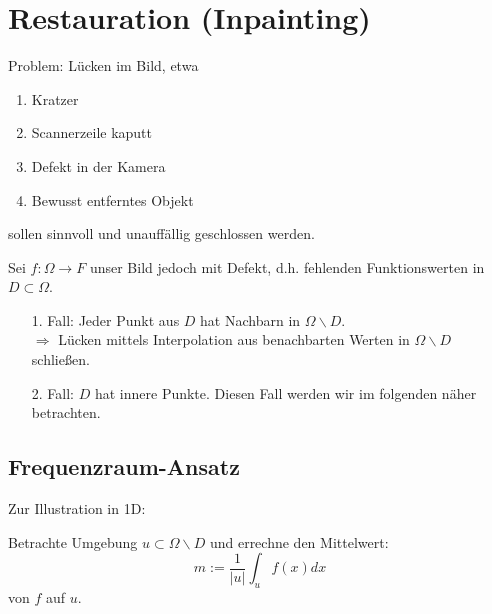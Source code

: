 \documentclass{article}
\theoremstyle{plain}
\theoremstyle{definition}
\numberwithin{equation}{section}
\newcommand{\abs}[1] {
\left| #1 \right|
}
\begin{document}
                \section{Restauration (Inpainting)}
  Problem: Lücken im Bild, etwa 

  \begin{enumerate}
    \item Kratzer
    \item Scannerzeile kaputt
    \item Defekt in der Kamera
    \item Bewusst entferntes Objekt
  \end{enumerate}
  sollen sinnvoll und unauffällig geschlossen werden.

  Sei $f: \Omega \to F$ unser Bild jedoch mit Defekt, d.h. fehlenden Funktionswerten in $D \subset \Omega$.

  \begin{enumerate}
    \item[1. Fall:] Jeder Punkt aus $D$ hat Nachbarn in $\Omega \backslash D$.\\
    $\Rightarrow$ Lücken mittels Interpolation aus benachbarten Werten in $\Omega \backslash D$ schließen.
    \item[2. Fall:] $D$ hat innere Punkte. Diesen Fall werden wir im folgenden näher betrachten.
  \end{enumerate}

  \subsection{Frequenzraum-Ansatz}
    Zur Illustration in 1D:
    \begin{center}
    \end{center}
    Betrachte Umgebung $u \subset \Omega \backslash D$ und errechne den Mittelwert:
    \[ m:= \frac{1}{\abs{u}} \int_u f(x) dx\]
    von $f$ auf $u$.
    
\end{document}
